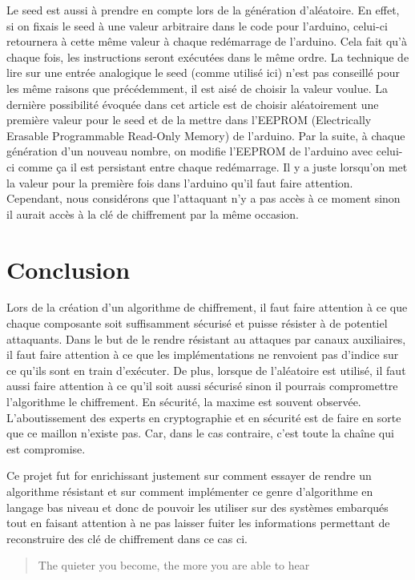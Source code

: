 \documentclass[letterpaper]{article}
\begin{document}
Le seed est aussi à prendre en compte lors de la génération d'aléatoire.
En effet, si on fixais le seed à une valeur arbitraire dans le code pour l'arduino, celui-ci retournera à cette même valeur à chaque redémarrage de l'arduino.
Cela fait qu'à chaque fois, les instructions seront exécutées dans le même ordre.
La technique de lire sur une entrée analogique le seed (comme utilisé ici) n'est pas conseillé pour les même raisons que précédemment, il est aisé de choisir la valeur voulue.
La dernière possibilité évoquée dans cet article est de choisir aléatoirement une première valeur pour le seed et de la mettre dans l'EEPROM (Electrically Erasable Programmable Read-Only Memory) de l'arduino. Par la suite, à chaque génération d'un nouveau nombre, on modifie l'EEPROM de l'arduino avec celui-ci comme ça il est persistant entre chaque redémarrage.
Il y a juste lorsqu'on met la valeur pour la première fois dans l'arduino qu'il faut faire attention.
Cependant, nous considérons que l'attaquant n'y a pas accès à ce moment sinon il aurait accès à la clé de chiffrement par la même occasion.

\section{Conclusion}
Lors de la création d'un algorithme de chiffrement, il faut faire attention à ce que chaque composante soit suffisamment sécurisé et puisse résister à de potentiel attaquants.
Dans le but de le rendre résistant au attaques par canaux auxiliaires, il faut faire attention à ce que les implémentations ne renvoient pas d'indice sur ce qu'ils sont en train d'exécuter.
De plus, lorsque de l'aléatoire est utilisé, il faut aussi faire attention à ce qu'il soit aussi sécurisé sinon il pourrais compromettre l'algorithme le chiffrement.
En sécurité, la maxime 
est souvent observée. L'aboutissement des experts en cryptographie et en sécurité est de faire en sorte que ce maillon n'existe pas. Car, dans le cas contraire, c'est toute la chaîne qui est compromise.

Ce projet fut for enrichissant justement sur comment essayer de rendre un algorithme résistant et sur comment implémenter ce genre d'algorithme en langage bas niveau et donc de pouvoir les utiliser sur des systèmes embarqués tout en faisant attention à ne pas laisser fuiter les informations permettant de reconstruire des clé de chiffrement dans ce cas ci.

\begin{quote}
    The quieter you become, the more you are able to hear
\end{quote}

\footnotesize


\end{document}
